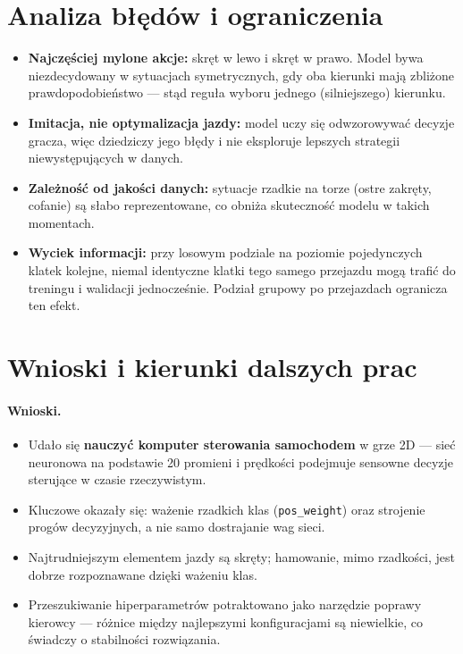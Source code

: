 \documentclass[11pt,a4paper]{article}
\begin{document}
\section{Analiza błędów i ograniczenia}
\label{sec:bledy}

\begin{itemize}
  \item \textbf{Najczęściej mylone akcje:} skręt w lewo i skręt w prawo. Model
        bywa niezdecydowany w sytuacjach symetrycznych, gdy oba kierunki mają
        zbliżone prawdopodobieństwo --- stąd reguła wyboru jednego (silniejszego)
        kierunku.
  \item \textbf{Imitacja, nie optymalizacja jazdy:} model uczy się odwzorowywać
        decyzje gracza, więc dziedziczy jego błędy i nie eksploruje lepszych
        strategii niewystępujących w danych.
  \item \textbf{Zależność od jakości danych:} sytuacje rzadkie na torze (ostre
        zakręty, cofanie) są słabo reprezentowane, co obniża skuteczność modelu
        w takich momentach.
  \item \textbf{Wyciek informacji:} przy losowym podziale na poziomie pojedynczych
        klatek kolejne, niemal identyczne klatki tego samego przejazdu mogą trafić
        do treningu i walidacji jednocześnie. Podział grupowy po przejazdach
        ogranicza ten efekt.
\end{itemize}

\section{Wnioski i kierunki dalszych prac}
\label{sec:wnioski}

\paragraph{Wnioski.}
\begin{itemize}[noitemsep]
  \item Udało się \textbf{nauczyć komputer sterowania samochodem} w grze 2D ---
        sieć neuronowa na podstawie 20 promieni i prędkości podejmuje sensowne
        decyzje sterujące w czasie rzeczywistym.
  \item Kluczowe okazały się: ważenie rzadkich klas (\texttt{pos\_weight}) oraz
        strojenie progów decyzyjnych, a nie samo dostrajanie wag sieci.
  \item Najtrudniejszym elementem jazdy są skręty; hamowanie, mimo rzadkości,
        jest dobrze rozpoznawane dzięki ważeniu klas.
  \item Przeszukiwanie hiperparametrów potraktowano jako narzędzie poprawy
        kierowcy --- różnice między najlepszymi konfiguracjami są niewielkie, co
        świadczy o stabilności rozwiązania.
\end{itemize}
\end{document}
